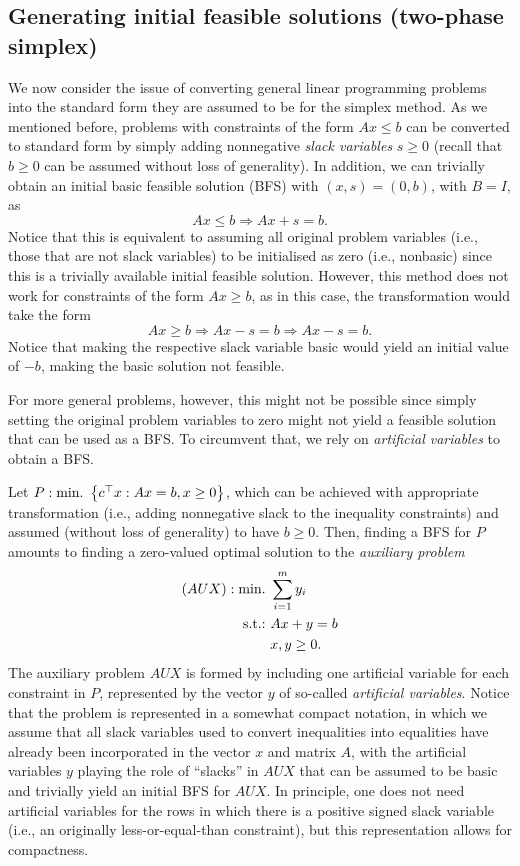\subsection{Generating initial feasible solutions (two-phase simplex)} 

We now consider the issue of converting general linear programming problems into the standard form they are assumed to be for the simplex method. As we mentioned before, problems with constraints of the form $Ax \le b$ can be converted to standard form by simply adding nonnegative \emph{slack variables} $s \geq 0$ (recall that $b \ge 0$ can be assumed without loss of generality). In addition, we can trivially obtain an initial basic feasible solution (BFS) with $(x,s) = (0,b)$, with $B = I$, as
%
\begin{equation*}
		Ax \leq b \Rightarrow Ax + s = b.
\end{equation*}
%
Notice that this is equivalent to assuming all original problem variables (i.e., those that are not slack variables) to be initialised as zero (i.e., nonbasic) since this is a trivially available initial feasible solution. However, this method does not work for constraints of the form $Ax \ge b$, as in this case, the transformation would take the form 
%
\begin{equation*}
	Ax \geq b \Rightarrow Ax - s = b \Rightarrow Ax - s = b.	
\end{equation*}
%
Notice that making the respective slack variable basic would yield an initial value of $-b$, making the basic solution not feasible.

For more general problems, however, this might not be possible since simply setting the original problem variables to zero might not yield a feasible solution that can be used as a BFS. To circumvent that, we rely on \emph{artificial variables} to obtain a BFS.

Let $P : \mathop{\text{min.~}}\left\{ c^\top x : Ax = b, x \geq 0 \right \}$, which can be achieved with appropriate transformation (i.e., adding nonnegative slack to the inequality constraints) and assumed (without loss of generality) to have $b \geq 0$. Then, finding a BFS for $P$ amounts to finding a zero-valued optimal solution to the \emph{auxiliary problem}
%
\begin{align*}
	(AUX) : \mathop{\text{min.~}} &\sum_{i=1}^m y_i \\
	\mathop{\text{s.t.:~}} & Ax + y = b \\
	    & x,y \geq 0.	
\end{align*}
%
The auxiliary problem $AUX$ is formed by including one artificial variable for each constraint in $P$, represented by the vector $y$ of so-called \emph{artificial variables}. Notice that the problem is represented in a somewhat compact notation, in which we assume that all slack variables used to convert inequalities into equalities have already been incorporated in the vector $x$ and matrix $A$, with the artificial variables $y$ playing the role of ``slacks'' in $AUX$ that can be assumed to be basic and trivially yield an initial BFS for $AUX$. In principle, one does not need artificial variables for the rows in which there is a positive signed slack variable (i.e., an originally less-or-equal-than constraint), but this representation allows for compactness. 

